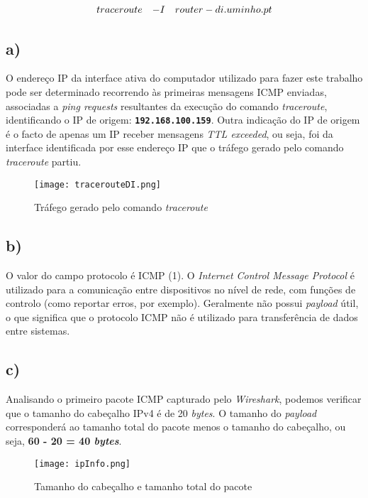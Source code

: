 \documentclass{llncs}
\begin{document}
\[
    \begin{array}{l l l l l l}
       traceroute&-I&router-di.uminho.pt
    \end{array}
\]

\subsection*{a)}

O endereço IP da interface ativa do computador utilizado para fazer este trabalho pode ser determinado recorrendo às primeiras mensagens ICMP enviadas, associadas a \textit{ping requests} resultantes da execução do comando \textit{traceroute}, identificando o IP de origem: \textbf{\texttt{192.168.100.159}}. Outra indicação do IP de origem é o facto de apenas um IP receber mensagens \textit{TTL exceeded}, ou seja, foi da interface identificada por esse endereço IP que o tráfego gerado pelo comando \textit{traceroute} partiu.

\begin{figure}[!ht]
    \begin{center}
        \texttt{[image: tracerouteDI.png]}
        \caption{Tráfego gerado pelo comando \textit{traceroute}}
    \end{center}
\end{figure}

\subsection*{b)}

O valor do campo protocolo é ICMP (1). O \textit{Internet Control Message Protocol} é utilizado para a comunicação entre dispositivos no nível de rede, com funções de controlo (como reportar erros, por exemplo). Geralmente não possui \textit{payload} útil, o que significa que o protocolo ICMP não é utilizado para transferência de dados entre sistemas.

\subsection*{c)}

Analisando o primeiro pacote ICMP capturado pelo \textit{Wireshark}, podemos verificar que o tamanho do cabeçalho IPv4 é de 20 \textit{bytes}. O tamanho do \textit{payload} corresponderá ao tamanho total do pacote menos o tamanho do cabeçalho, ou seja, \textbf{60 - 20 = 40 \textit{bytes}}.

\begin{figure}[!ht]
    \begin{center}
        \texttt{[image: ipInfo.png]}
        \caption{Tamanho do cabeçalho e tamanho total do pacote}
    \end{center}
\end{figure}
\end{document}
